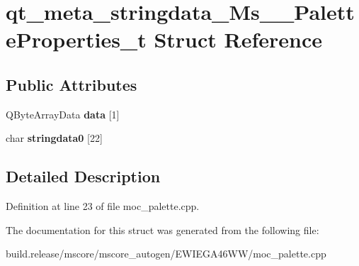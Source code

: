 \hypertarget{structqt__meta__stringdata___ms_____palette_properties__t}{}\section{qt\+\_\+meta\+\_\+stringdata\+\_\+\+Ms\+\_\+\+\_\+\+Palette\+Properties\+\_\+t Struct Reference}
\label{structqt__meta__stringdata___ms_____palette_properties__t}
\subsection*{Public Attributes}
\begin{DoxyCompactItemize}
\item 
\mbox{\label{structqt__meta__stringdata___ms_____palette_properties__t_ae1a765ce713f391c1a640e0352b8243a}} 
Q\+Byte\+Array\+Data {\bfseries data} \mbox{[}1\mbox{]}
\item 
\mbox{\label{structqt__meta__stringdata___ms_____palette_properties__t_a8cc4d2cea7527511cd19c1e033b89cbd}} 
char {\bfseries stringdata0} \mbox{[}22\mbox{]}
\end{DoxyCompactItemize}


\subsection{Detailed Description}


Definition at line 23 of file moc\+\_\+palette.\+cpp.



The documentation for this struct was generated from the following file\+:\begin{DoxyCompactItemize}
\item 
build.\+release/mscore/mscore\+\_\+autogen/\+E\+W\+I\+E\+G\+A46\+W\+W/moc\+\_\+palette.\+cpp\end{DoxyCompactItemize}
